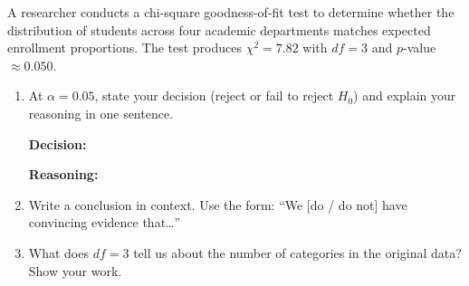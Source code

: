 \documentclass[10pt]{article}
\begin{document}
\namedateperiod

\vspace{0.15in}

A researcher conducts a chi-square goodness-of-fit test to determine whether the
distribution of students across four academic departments matches expected enrollment
proportions. The test produces $\chi^2 = 7.82$ with $df = 3$ and $p$-value $\approx 0.050$.

\begin{enumerate}

  \item At $\alpha = 0.05$, state your decision (reject or fail to reject $H_0$)
        and explain your reasoning in one sentence.

        \textbf{Decision:} 

        \textbf{Reasoning:}

  \item Write a conclusion in context. Use the form:
        ``We [do / do not] have convincing evidence that\ldots''


  \item What does $df = 3$ tell us about the number of categories in the
        original data? Show your work.


\end{enumerate}
\end{document}
